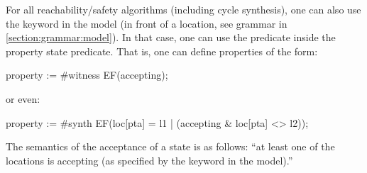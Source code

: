 \begin{remark}\label{remark:accepting}
	For all reachability/safety algorithms (including cycle synthesis), one can also use the  keyword in the model (in front of a location, see grammar in \cref{section:grammar:model}).
	In that case, one can use the  predicate inside the property state predicate.
	That is, one can define properties of the form:

\begin{IMITATORproperty}
property := #witness EF(accepting);
\end{IMITATORproperty}

	or even:

\begin{IMITATORproperty}
property := #synth EF(loc[pta] = l1 | (accepting & loc[pta] <> l2));
\end{IMITATORproperty}

	The semantics of the acceptance of a state is as follows: ``at least one of the locations is accepting (as specified by the  keyword in the model).''

%
\end{remark}

%
%
%
%



